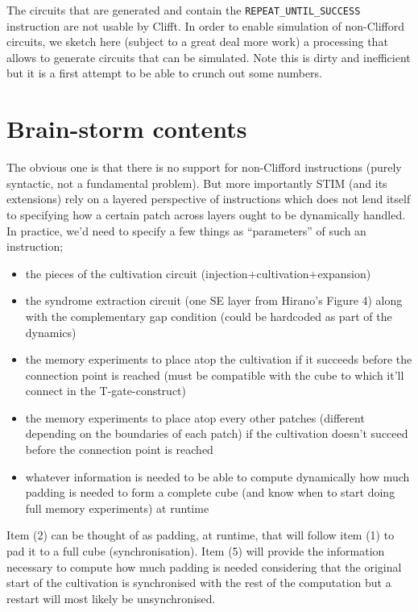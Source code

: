 \documentclass{article}
\begin{document}
	The circuits that are generated and contain the {\tt REPEAT\_UNTIL\_SUCCESS} instruction are not usable by Clifft. In order to enable simulation of non-Clifford circuits, we sketch here (subject to a great deal more work) a processing that allows to generate circuits that can be simulated. Note this is dirty and inefficient but it is a first attempt to be able to crunch out some numbers.

	\newpage

	\appendix
	
	\section{Brain-storm contents}
	
	The obvious one is that there is no support for non-Clifford instructions (purely syntactic, not a fundamental problem). But more importantly STIM (and its extensions) rely on a layered perspective of instructions which does not lend itself to specifying how a certain patch across layers ought to be dynamically handled. In practice, we’d need to specify a few things as “parameters” of such an instruction;

	\begin{itemize}
		\item the pieces of the cultivation circuit (injection+cultivation+expansion)
		\item the syndrome extraction circuit (one SE layer from Hirano’s Figure 4) along with the complementary gap condition (could be hardcoded as part of the dynamics)
		\item the memory experiments to place atop the cultivation if it succeeds before the connection point is reached (must be compatible with the cube to which it’ll connect in the T-gate-construct)
		\item the memory experiments to place atop every other patches (different depending on the boundaries of each patch) if the cultivation doesn’t succeed before the connection point is reached
		\item whatever information is needed to be able to compute dynamically how much padding is needed to form a complete cube (and know when to start doing full memory experiments) at runtime
	\end{itemize}

	Item (2) can be thought of as padding, at runtime, that will follow item (1) to pad it to a full cube (synchronisation). Item (5) will provide the information necessary to compute how much padding is needed considering that the original start of the cultivation is synchronised with the rest of the computation but a restart will most likely be unsynchronised. \\
\end{document}
